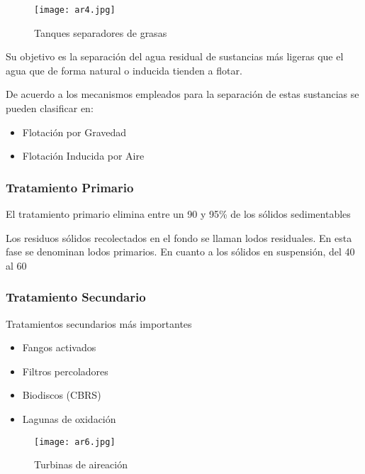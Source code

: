 \begin{figure}[h!]
\centering
  \texttt{[image: ar4.jpg]}
  \caption{Tanques separadores de grasas}
  \label{ar4}
\end{figure}
Su objetivo es la separación del agua residual de sustancias más ligeras que el agua que de forma natural o inducida tienden a flotar.

De acuerdo a los mecanismos empleados para la separación de estas sustancias se pueden clasificar en:
\begin{itemize}
    \item Flotación por Gravedad
    \item Flotación Inducida por Aire    
\end{itemize}

\subsubsection{Tratamiento Primario}
El tratamiento primario elimina entre un 90 y 95\% de los sólidos sedimentables

Los residuos sólidos recolectados en el fondo se llaman lodos residuales. En esta fase se denominan lodos primarios. En cuanto a los sólidos en suspensión, del 40 al 60%

\subsubsection{Tratamiento Secundario}
Tratamientos secundarios más importantes
\begin{itemize}
    \item Fangos activados
    \item Filtros percoladores
    \item Biodiscos (CBRS)
    \item Lagunas de oxidación
\end{itemize}
\begin{figure}[h!]
\centering
  \texttt{[image: ar6.jpg]}
  \caption{Turbinas de aireación}
  \label{ar6}
\end{figure}

